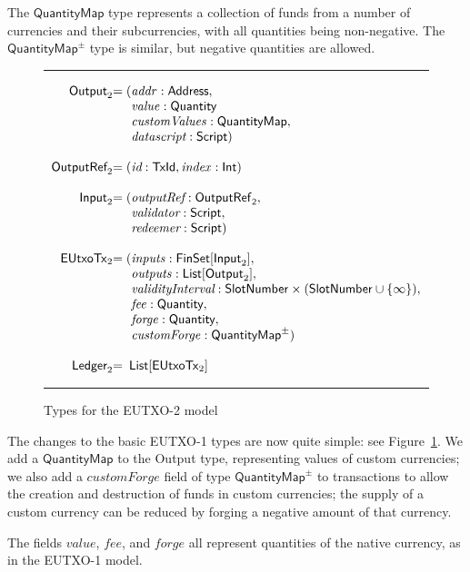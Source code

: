 \documentclass[a4paper]{article}
\renewcommand{\i}{\textit}  %
\newcommand{\s}{\textsf}  %
\theoremstyle{definition}  %
\newenvironment{arraydefs}[1]{\setlength{\arraycolsep}{0pt}\begin{array}{#1}}{\end{array}}
\newcommand\rfskip{7pt}
\newenvironment{ruledfigure}[1]{\begin{figure}[#1]\hrule\vspace{\rfskip}}{\vspace{\rfskip}\hrule\end{figure}}
\newcommand{\List}[1]{\ensuremath{\s{List}[#1]}}
\newcommand{\FinSet}[1]{\ensuremath{\s{FinSet}[#1]}}
\newcommand{\mi}[1]{\ensuremath{\mathit{#1}}}
\newcommand{\idx}{\mi{index}}
\newcommand{\inputs}{\mi{inputs}}
\newcommand{\outputs}{\mi{outputs}}
\newcommand{\forge}{\mi{forge}}
\newcommand{\fee}{\mi{fee}}
\newcommand{\addr}{\mi{addr}}
\newcommand{\val}{\mi{value}}  %
\newcommand{\customvals}{\mi{customValues}}
\newcommand{\customforge}{\mi{customForge}}
\newcommand{\msf}[1]{\ensuremath{\mathsf{#1}}}
\newcommand{\slotnum}{\msf{SlotNumber}}
\newcommand{\eutxotx}{\msf{EUtxoTx}}
\newcommand{\qty}{\ensuremath{\s{Quantity}}}
\newcommand{\qtymap}{\ensuremath{\s{QuantityMap}}}
\begin{document}
\noindent The $\qtymap$ type represents a collection of funds from a
number of currencies and their subcurrencies, with all quantities
being non-negative.  The $\qtymap^{\pm}$ type is similar, but
negative quantities are allowed.

\begin{ruledfigure}{H}
  \[
  \begin{arraydefs}{rll}
    \s{Output}_2 &= (&\addr: \s{Address},\\
    && \val: \qty\\
    && \customvals: \qtymap,\\
    && \i{datascript}: \s{Script})\\
    \\
    \s{OutputRef}_2 &= (&\i{id}: \s{TxId}, \idx: \s{Int})\\
    \\
    \s{Input}_2 &= (& \i{outputRef}: \sf{OutputRef}_2,\\
                     && \i{validator}: \s{Script},\\
                     & & \i{redeemer}: \s{Script})\\
\\
    \eutxotx_2 &= ( &\inputs: \FinSet{\s{Input}_2},\\
    &&\outputs: \List{\s{Output}_2},\\
    &&\i{validityInterval}: \slotnum \times (\slotnum \cup \{\infty\}),\\
    &&\fee: \qty,\\
    &&\forge: \qty,\\
    &&\customforge: \qtymap^{\pm})\\
    \\
    \s{Ledger}_2 &=&\!\List{\eutxotx_2}\\
\end{arraydefs}
  \]
  \caption{Types for the EUTXO-2 model}
  \label{fig:eutxo-2-types}
\end{ruledfigure}

\noindent The changes to the basic EUTXO-1 types are now quite simple:
see Figure~\ref{fig:eutxo-2-types}.  We add a \qtymap{} to the
\s{Output} type, representing values of custom currencies; we also add
a \customforge{} field of type $\qtymap^{\pm}$ to transactions to
allow the creation and destruction of funds in custom currencies; the
supply of a custom currency can be reduced by forging a negative
amount of that currency.

The fields \val, \fee, and \forge{} all represent quantities of the
native currency, as in the EUTXO-1 model.
\end{document}

